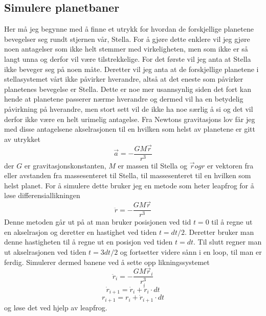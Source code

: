 \documentclass[11pt, A4paper, norsk]{report}
\begin{document}
		\subsection{Simulere planetbaner}
Her må jeg begynne med å finne et utrykk for hvordan de forskjellige planetene bevegelser seg rundt stjernen vår, Stella. For å gjøre dette enklere vil jeg gjøre noen antagelser som ikke helt stemmer med virkeligheten, men som ikke er så langt unna og derfor vil være tilstrekkelige. For det første vil jeg anta at Stella ikke beveger seg på noen måte. Deretter vil jeg anta at de forskjellige planetene i stellasystemet vårt ikke påvirker hverandre, altså at det eneste som påvirker planetenes bevegelse er Stella. Dette er noe mer usannsynlig siden det fort kan hende at planetene passerer nærme hverandre og dermed vil ha en betydelig påvirkning på hverandre, men stort sett vil de ikke ha noe særlig å si og det vil derfor ikke være en helt urimelig antagelse. Fra Newtons gravitasjons lov får jeg med disse antagelsene akselrasjonen til en hvilken som helst av planetene er gitt av utrykket \cite{part2} $$\vec{a} = - \frac{GM\vec{r}}{r^3}$$ der $G$ er gravitasjonskonstanten, $M$ er massen til Stella og $\vec{r} og r$ er vektoren fra eller avstanden fra massesenteret til Stella, til massesenteret til en hvilken som helst planet. For å simulere dette bruker jeg en metode som heter leapfrog for å løse differensiallikningen $$ \ddot{r} = - \frac{GM\vec{r}}{r^3}$$ Denne metoden går ut på at man bruker posisjonen ved tid $t = 0$ til å regne ut en akselrasjon og deretter en hastighet ved tiden $t = dt/2$. Deretter bruker man denne hastigheten til å regne ut en posisjon ved tiden $t = dt$. Til slutt regner man ut akselrasjonen ved tiden $t = 3dt/2$ og fortsetter videre sånn i en loop, til man er ferdig. Simulerer dermed banene ved å sette opp likningssystemet $$ \ddot{r}_i = - \frac{GM\vec{r}_i}{r_i^3}$$ $$\dot{r}_{i + 1} = \dot{r}_i + \ddot{r}_i \cdot dt$$ $$r_{i + 1} = r_ i + \dot{r}_{i + 1} \cdot dt $$ og løse det ved hjelp av leapfrog.
\end{document}
